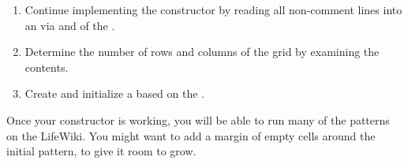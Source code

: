 \begin{exercise}
\begin{enumerate}
\item Continue implementing the constructor by reading all non-comment lines into an  via  and  of the .

\item Determine the number of rows and columns of the grid by examining the  contents.

\item Create and initialize a  based on the .

\end{enumerate}

Once your constructor is working, you will be able to run many of the patterns on the LifeWiki.
You might want to add a margin of empty cells around the initial pattern, to give it room to grow.

\end{exercise}


